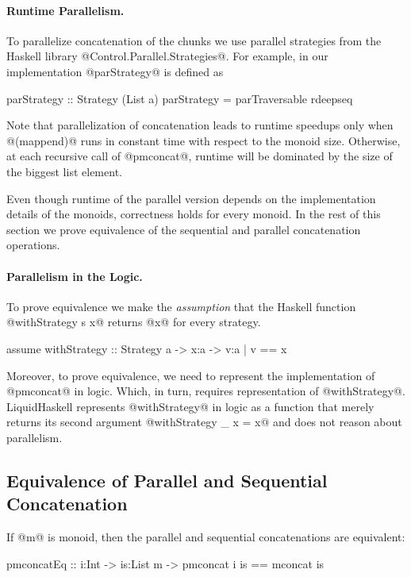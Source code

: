 \paragraph{Runtime Parallelism.}
To parallelize concatenation of the chunks we use parallel strategies 
from the Haskell library @Control.Parallel.Strategies@.
%
For example, in our implementation @parStrategy@ is defined as
\begin{code}
parStrategy :: Strategy (List a)
parStrategy = parTraversable rdeepseq
\end{code}

Note that parallelization of concatenation leads to runtime speedups
only when @(mappend)@ runs in constant time with respect to the monoid size. 
%
Otherwise, at each recursive call of @pmconcat@,
runtime will be dominated by the size of the biggest list element. 

Even though runtime of the parallel version depends on the implementation details 
of the monoids, correctness holds for every monoid. 
%
In the rest of this section we prove equivalence of the sequential and parallel concatenation operations. 


\paragraph{Parallelism in the Logic.}
To prove equivalence we make the \textit{assumption}
that the Haskell function @withStrategy s x@ 
returns @x@ for every strategy.
\begin{code}
assume withStrategy :: Strategy a -> x:a -> {v:a | v == x}
\end{code}
%
Moreover, to prove equivalence, we need to represent 
the implementation of @pmconcat@ in logic.
%
Which, in turn, requires representation of @withStrategy@. 
%
LiquidHaskell represents @withStrategy@ in logic as a function that merely returns
its second argument @withStrategy _ x = x@
and does not reason about parallelism. 

\subsection{Equivalence of Parallel and Sequential Concatenation}

\begin{theorem}\label{theorem:equivalence:concat}
If @m@ is monoid, then the parallel and sequential concatenations are equivalent:
\begin{code}
  pmconcatEq :: i:Int -> is:List m -> {pmconcat i is == mconcat is }
\end{code}
\end{theorem}

